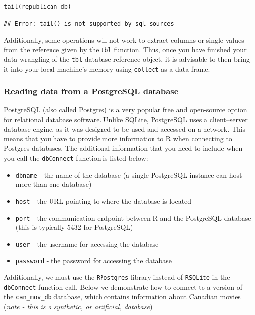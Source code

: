 \documentclass[
]{article}
\providecommand{\tightlist}{%
  \setlength{\itemsep}{0pt}\setlength{\parskip}{0pt}}
\begin{document}
\begin{verbatim}
tail(republican_db)
\end{verbatim}

\begin{verbatim}
## Error: tail() is not supported by sql sources
\end{verbatim}

Additionally, some operations will not work to extract columns or single
values from the reference given by the \texttt{tbl} function. Thus, once
you have finished your data wrangling of the \texttt{tbl} database
reference object, it is advisable to then bring it into your local
machine's memory using \texttt{collect} as a data frame.

\hypertarget{reading-data-from-a-postgresql-database}{%
\subsubsection{Reading data from a PostgreSQL
database}\label{reading-data-from-a-postgresql-database}}

PostgreSQL (also called Postgres) is a very popular free and open-source
option for relational database software. Unlike SQLite, PostgreSQL uses
a client--server database engine, as it was designed to be used and
accessed on a network. This means that you have to provide more
information to R when connecting to Postgres databases. The additional
information that you need to include when you call the
\texttt{dbConnect} function is listed below:

\begin{itemize}
\tightlist
\item
  \texttt{dbname} - the name of the database (a single PostgreSQL
  instance can host more than one database)
\item
  \texttt{host} - the URL pointing to where the database is located
\item
  \texttt{port} - the communication endpoint between R and the
  PostgreSQL database (this is typically 5432 for PostgreSQL)
\item
  \texttt{user} - the username for accessing the database
\item
  \texttt{password} - the password for accessing the database
\end{itemize}

Additionally, we must use the \texttt{RPostgres} library instead of
\texttt{RSQLite} in the \texttt{dbConnect} function call. Below we
demonstrate how to connect to a version of the \texttt{can\_mov\_db}
database, which contains information about Canadian movies (\emph{note -
this is a synthetic, or artificial, database}).
\end{document}

